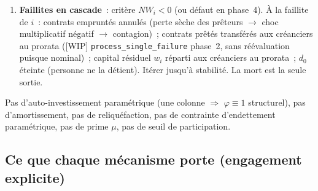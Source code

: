 \documentclass[11pt,a4paper]{article}
\newcommand{\NW}{\mathit{NW}}
\begin{document}
\begin{enumerate}
  \begin{align*}
    \rho &= r+\delta && \text{coût/rendement effectif d'une unité de capital échangée}\\
    w^*(\rho) &= \left(\frac{\alpha}{2\rho}\right)^2 && \text{cible commune de capital}\\
    q_{\mathrm{dem}} &= \max\bigl(0,\; w^*(\rho) - w_b\bigr) && \text{demande de l'emprunteur}\\
    q_{\mathrm{off}} &= \max\bigl(0,\; w_l - w^*(\rho)\bigr) && \text{offre du prêteur}
  \end{align*}
  volume~: $q = \min(q_{\mathrm{dem}}, q_{\mathrm{off}})$~; transfert conservatif $w_l \mathrel{-}= q$, $w_b \mathrel{+}= q$~; création du contrat $(l, b, q, r)$.

  Une seule règle symétrique --- « viser $w^*(\rho)$~; prêter l'excédent, emprunter le manque » --- définit les deux rôles~; personne n'est prêteur ou emprunteur par nature. Répond aux notes inline du [WIP] (\texttt{simulation.py:867} rounds aléatoires, \texttt{:900} pool unique, \texttt{:870} suppression de \texttt{MAX_IDLE}).
  \item \textbf{Faillites en cascade}~: critère $\NW_i < 0$ (ou défaut en phase~4). À la faillite de $i$~: contrats empruntés annulés (perte sèche des prêteurs $\to$ choc multiplicatif négatif $\to$ contagion)~; contrats prêtés transférés aux créanciers au prorata ([WIP] \texttt{process_single_failure} phase~2, sans réévaluation puisque nominal)~; capital résiduel $w_i$ réparti aux créanciers au prorata~; $d_0$ éteinte (personne ne la détient). Itérer jusqu'à stabilité. La mort est la seule sortie.
\end{enumerate}

Pas d'auto-investissement paramétrique (une colonne $\Rightarrow$ $\varphi \equiv 1$ structurel), pas d'amortissement, pas de reliquéfaction, pas de contrainte d'endettement paramétrique, pas de prime $\mu$, pas de seuil de participation.

\subsection{Ce que chaque mécanisme porte (engagement explicite)}
\label{sec:tableau-mecanismes}
\end{document}
